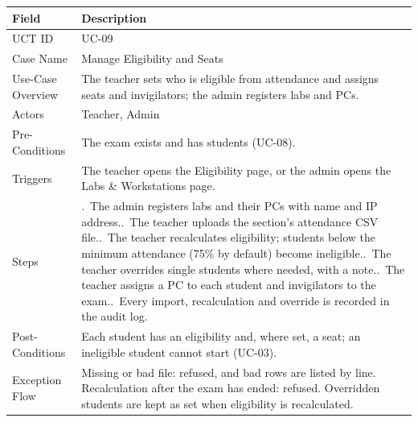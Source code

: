 \begin{lrbox}{\uctbox}{\small\renewcommand{\arraystretch}{1.1}\setlength{\tabcolsep}{6pt}%
\begin{tabular}{>{\raggedright\arraybackslash}p{3.6cm}>{\raggedright\arraybackslash}p{\dimexpr\textwidth-3.6cm-4\tabcolsep\relax}}
\hline\hline
\textbf{Field} & \textbf{Description} \\ \hline
UCT ID & UC-09 \\
Case Name & Manage Eligibility and Seats \\
Use-Case Overview & The teacher sets who is eligible from attendance and assigns seats and invigilators; the admin registers labs and PCs. \\
Actors & Teacher, Admin \\
Pre-Conditions & The exam exists and has students (UC-08). \\
Triggers & The teacher opens the Eligibility page, or the admin opens the Labs \& Workstations page. \\
Steps & 1.~The admin registers labs and their PCs with name and IP address.\newline
2.~The teacher uploads the section's attendance CSV file.\newline
3.~The teacher recalculates eligibility; students below the minimum attendance (75\% by default) become ineligible.\newline
4.~The teacher overrides single students where needed, with a note.\newline
5.~The teacher assigns a PC to each student and invigilators to the exam.\newline
6.~Every import, recalculation and override is recorded in the audit log. \\
Post-Conditions & Each student has an eligibility and, where set, a seat; an ineligible student cannot start (UC-03). \\
Exception Flow & Missing or bad file: refused, and bad rows are listed by line. Recalculation after the exam has ended: refused. Overridden students are kept as set when eligibility is recalculated. \\
\hline\hline
\end{tabular}}\end{lrbox}
\begin{table}[H]
\centering
\caption{Use Case Table for Manage Eligibility and Seats}\label{tab:uc09}
\vspace{4pt}
\usebox{\uctbox}
\end{table}

